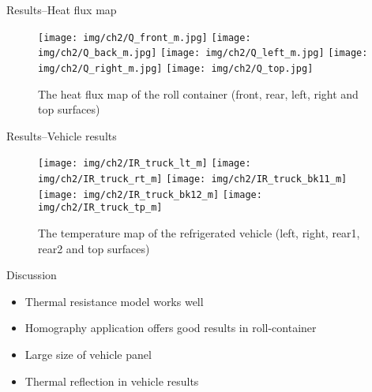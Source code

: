 \begin{frame}{Results--\small{Heat flux map}}
    \begin{figure}
        \vspace*{-5pt}
        \centering
        \texttt{[image: img/ch2/Q\_front\_m.jpg]}
        \hspace{5pt}
        \texttt{[image: img/ch2/Q\_back\_m.jpg]}
        \hspace*{5pt}
        \texttt{[image: img/ch2/Q\_left\_m.jpg]}
        \hspace{5pt}
        \texttt{[image: img/ch2/Q\_right\_m.jpg]}
        \texttt{[image: img/ch2/Q\_top.jpg]}
        \vspace*{-5pt}
        \caption{\footnotesize{The heat flux map of the roll container (front, rear, left, right and top surfaces)}}
    \end{figure}
\end{frame}


\begin{frame}{Results--\small{Vehicle results}}
    \begin{figure}
        \vspace*{-5pt}
        \centering
        \texttt{[image: img/ch2/IR\_truck\_lt\_m]}
        \hspace{3pt}
        \texttt{[image: img/ch2/IR\_truck\_rt\_m]}
        \texttt{[image: img/ch2/IR\_truck\_bk11\_m]}
        \hspace{6pt}
        \texttt{[image: img/ch2/IR\_truck\_bk12\_m]}
        \texttt{[image: img/ch2/IR\_truck\_tp\_m]}
        \vspace*{-5pt}
        \caption{\footnotesize{The temperature map of the refrigerated vehicle (left, right, rear1, rear2 and top surfaces)}}
    \end{figure}
\end{frame}


\begin{frame}{Discussion}
    \begin{itemize}[<+->]
    \pause
    \large
        \item Thermal resistance model works well
        \item Homography application offers good results in roll-container
        \item Large size of vehicle panel 
        \item Thermal reflection in vehicle results
    \end{itemize}
\end{frame}
